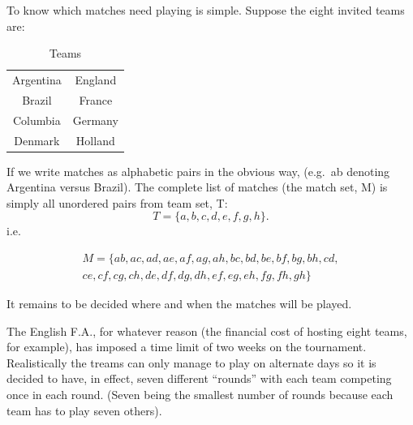 \documentclass[
  11pt,
  a4paper]{book}
\begin{document}
To know which matches need playing is simple. Suppose the eight invited
teams are:

\begin{longtable}[]{@{}cc@{}}
\caption{Teams}\tabularnewline
\toprule
\endhead
\begin{minipage}[t]{0.16\columnwidth}\centering
Argentina\strut
\end{minipage} & \begin{minipage}[t]{0.16\columnwidth}\centering
England\strut
\end{minipage}\tabularnewline
\begin{minipage}[t]{0.16\columnwidth}\centering
Brazil\strut
\end{minipage} & \begin{minipage}[t]{0.16\columnwidth}\centering
France\strut
\end{minipage}\tabularnewline
\begin{minipage}[t]{0.16\columnwidth}\centering
Columbia\strut
\end{minipage} & \begin{minipage}[t]{0.16\columnwidth}\centering
Germany\strut
\end{minipage}\tabularnewline
\begin{minipage}[t]{0.16\columnwidth}\centering
Denmark\strut
\end{minipage} & \begin{minipage}[t]{0.16\columnwidth}\centering
Holland\strut
\end{minipage}\tabularnewline
\bottomrule
\end{longtable}

If we write matches as alphabetic pairs in the obvious way, (e.g.~ab
denoting Argentina versus Brazil). The complete list of matches (the
match set, M) is simply all unordered pairs from team set, T:
\[T = \{a, b, c, d, e, f, g, h\}.\] i.e.~

\begin{equation*}
\begin{split}
M = \{
  ab,ac,ad,ae,af,ag,ah,bc,bd,be,bf,bg,bh,cd,\\
  ce,cf,cg,ch,de,df,dg,dh,ef,eg,eh,fg,fh,gh
\}
\end{split}
\end{equation*}

It remains to be decided where and when the matches will be played.

The English F.A., for whatever reason (the financial cost of hosting
eight teams, for example), has imposed a time limit of two weeks on the
tournament. Realistically the treams can only manage to play on
alternate days so it is decided to have, in effect, seven different
``rounds'' with each team competing once in each round. (Seven being
the smallest number of rounds because each team has to play seven
others).
\end{document}
